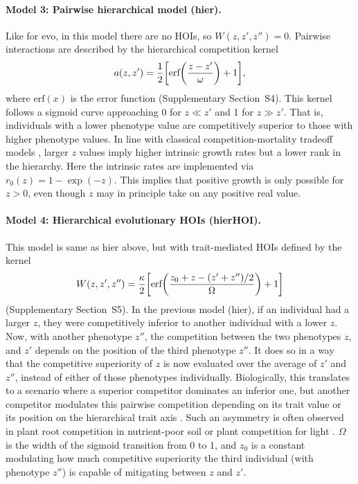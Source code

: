 \documentclass[11pt]{article}
\newcommand{\SI}{Supplementary}
\let\originalleft\left
\let\originalright\right
\renewcommand{\left}{\mathopen{}\mathclose\bgroup\originalleft}
\renewcommand{\right}{\aftergroup\egroup\originalright}
\begin{document}
\paragraph{Model 3: Pairwise hierarchical model (hier).} Like for evo, in this model there are no HOIs, so $W(z, z', z'') = 0$. Pairwise interactions are described by the hierarchical competition kernel
\begin{equation}
  \label{eq:hier-kernel}
  a(z,z') = \frac{1}{2} \left[ \text{erf} \left( \frac{z-z'}{\omega} \right) + 1 \right],
\end{equation}
where $\text{erf}(x)$ is the error function (\SI{} Section~S4). This kernel follows a sigmoid curve approaching 0 for $z \ll z'$ and 1 for $z \gg z'$. That is, individuals with a lower phenotype value are competitively superior to those with higher phenotype values. In line with classical competition-mortality tradeoff models \citep{adler_is_2000}, larger $z$ values imply higher intrinsic growth rates but a lower rank in the hierarchy. Here the intrinsic rates are implemented via $r_0(z) = 1 - \exp(-z)$. This implies that positive growth is only possible for $z>0$, even though $z$ may in principle take on any positive real value.

\paragraph{Model 4: Hierarchical evolutionary HOIs (hierHOI).} This model is same as hier above, but with trait-mediated HOIs defined by the kernel
\begin{equation}
  \label{eq:hierHOI-kernel}
  W(z,z',z'') = \frac{\kappa}{2} \left[ \text{erf}\left(\frac{z_0 + z - (z' + z'') / 2}{\Omega}\right) + 1\right]
\end{equation}
(\SI{} Section~S5). In the previous model (hier), if an individual had a larger $z$, they were competitively inferior to another individual with a lower $z$. Now, with another phenotype $z''$, the competition between the two phenotypes $z$, and $z'$ depends on the position of the third phenotype $z''$. It does so in a way that the competitive superiority of $z$ is now evaluated over the average of $z'$ and $z''$, instead of either of those phenotypes individually. Biologically, this translates to a scenario where a superior competitor dominates an inferior one, but another competitor modulates this pairwise competition depending on its trait value or its position on the hierarchical trait axis \citep{abrams_defining_2007, van_veen_stable_2005}. Such an asymmetry is often observed in plant root competition in nutrient-poor soil or plant competition for light \citep{rasmussen_size-asymmetric_2019}. $ \Omega$ is the width of the sigmoid transition from 0 to 1, and $z_0$ is a constant modulating how much competitive superiority the third individual (with phenotype $z''$) is capable of mitigating between $z$ and $z'$.
\end{document}
